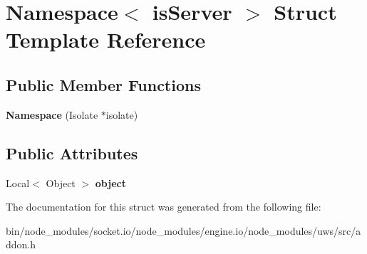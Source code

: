 \hypertarget{struct_namespace}{}\section{Namespace$<$ is\+Server $>$ Struct Template Reference}
\label{struct_namespace}
\subsection*{Public Member Functions}
\begin{DoxyCompactItemize}
\item 
\mbox{\label{struct_namespace_a3a87eeb08de243fed46d8ff5e271a282}} 
{\bfseries Namespace} (Isolate $\ast$isolate)
\end{DoxyCompactItemize}
\subsection*{Public Attributes}
\begin{DoxyCompactItemize}
\item 
\mbox{\label{struct_namespace_a4e54034403602eb3139ed56e04719d77}} 
Local$<$ Object $>$ {\bfseries object}
\end{DoxyCompactItemize}


The documentation for this struct was generated from the following file\+:\begin{DoxyCompactItemize}
\item 
bin/node\+\_\+modules/socket.\+io/node\+\_\+modules/engine.\+io/node\+\_\+modules/uws/src/addon.\+h\end{DoxyCompactItemize}
